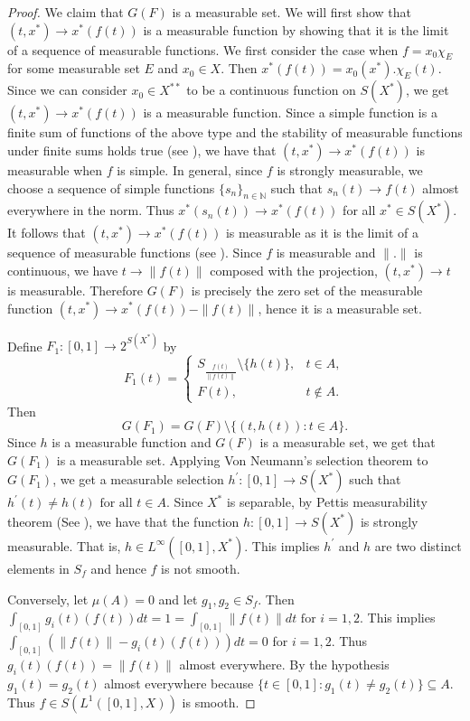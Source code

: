 \documentclass[12pt]{amsart}
\theoremstyle{definition}
\numberwithin{equation}{section}
\begin{document}
\begin{proof}
We claim that $ G(F) $ is a measurable set. We will first show that $(t,x^*)\to x^*(f(t))$ is a measurable function by showing that it is the limit of a sequence of measurable functions. We first consider the case when $f = x_0 \chi_E$ for some measurable set $E$ and $x_{0}\in X$. Then $x^*(f(t))=x_0(x^*).\chi_E(t)$. Since we can consider $x_{0}\in X^{**}$ to be a continuous function on $S(X^*)$, we get $(t, x^*) \to x^*(f(t))$ is a measurable function. Since a simple function is a finite sum of functions of the above type and the stability of measurable functions under finite sums holds true (see \cite[Chapter~II]{DU}), we have that $(t,x^*) \to x^*(f(t))$ is measurable when $f$ is simple. In general, since $f$ is strongly measurable, we choose a sequence of simple functions $ \{s_n\}_{n\in \mathbb{N}} $ such that $s_n(t) \to f(t)$  almost everywhere in the norm. Thus $x^*(s_n(t)) \to x^*(f(t))$ for all $x^*\in S(X^*)$. It follows that $(t, x^*)\to x^*(f(t)) $ is measurable as it is the limit of a sequence of measurable functions (see \cite[Chapter~II]{DU}). 
Since $f$ is measurable and $\|.\|$ is continuous, we have $t \to \|f(t)\|$ composed with the projection, $(t,x^*)\to t$ is measurable. Therefore $ G(F) $ is precisely the zero set of the measurable function $(t,x^*) \to x^*(f(t)) - \|f(t)\| $, hence it is a measurable set.



 
Define $ F_1: [0,1] \to 2^{S(X^*)} $ by
\[
F_{1}(t) =
\begin{cases} 
S_{\frac{f(t)}{\|f(t)\|}}\setminus\{h(t)\}, & t \in A , \\
F(t), & t \notin A.
\end{cases}
\]
Then
\[
G(F_1) = G(F) \setminus \{(t, h(t)): t \in A\}.
\]
Since $ h $ is a measurable function and $G(F)$ is a measurable set, we get that $ G(F_1) $ is a measurable set. Applying Von Neumann's selection theorem to $G(F_1)$, we get a measurable selection $ h^{'}: [0,1] \to S(X^*)$ such that $h^{'}(t) \neq h(t)$  $\text{for all  } t \in A$. Since $X^*$ is separable, by Pettis measurability theorem (See \cite[Pg.~42]{DU}), we have that the function $h:[0,1]\to S(X^*)$ is strongly measurable. That is, $h\in L^{\infty}([0,1],X^*)$. This implies $ h^{'}$ and $h$ are two distinct elements in $S_{f}$ and hence $f$ is not smooth. 

Conversely, let $\mu(A)=0$ and let $g_{1},g_{2}\in S_{f}$. Then $\int_{[0,1]}{g_{i}(t)(f(t))dt=1=\int_{[0,1]}\|f(t)\|dt\text{ for }i=1,2}$. This implies $\int_{[0,1]}{(\|f(t)\|-g_{i}(t)(f(t)))dt=0}$ for $i=1,2$. Thus $g_{i}(t)(f(t))=\|f(t)\|$ almost everywhere. By the hypothesis $g_{1}(t)=g_{2}(t)$ almost everywhere because $\{t\in [0,1]: g_{1}(t)\neq g_{2}(t)\}\subseteq A$. Thus $f\in S(L^{1}([0,1],X))$ is smooth.
\end{proof}
\end{document}
